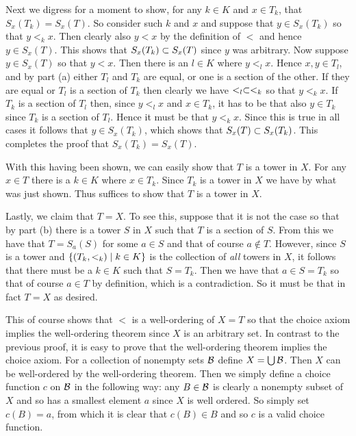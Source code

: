{{    Next we digress for a moment to show, for any $k \in K$ and $x \in T_k$, that $S_x(T_k) = S_x(T)$.
    So consider such $k$ and $x$ and suppose that $y \in S_x(T_k)$ so that $y <_k x$.
    Then clearly also $y < x$ by the definition of $<$ and hence $y \in S_x(T)$.
    This shows that $S_x(T_k) \ss S_x(T)$ since $y$ was arbitrary.
    Now suppose $y \in S_x(T)$ so that $y < x$.
    Then there is an $l \in K$ where $y <_l x$.
    Hence $x,y \in T_l$, and by part (a) either $T_l$ and $T_k$ are equal, or one is a section of the other.
    If they are equal or $T_l$ is a section of $T_k$ then clearly we have $<_l \ss <_k$ so that $y <_k x$.
    If $T_k$ is a section of $T_l$ then, since $y <_l x$ and $x \in T_k$, it has to be that also $y \in T_k$ since $T_k$ is a section of $T_l$.
    Hence it must be that $y <_k x$.
    Since this is true in all cases it follows that $y \in S_x(T_k)$, which shows that $S_x(T) \ss S_x(T_k)$.
    This completes the proof that $S_x(T_k) = S_x(T)$.

    With this having been shown, we can easily show that $T$ is a tower in $X$.
    For any $x \in T$ there is a $k \in K$ where $x \in T_k$.
    Since $T_k$ is a tower in $X$ we have
    by what was just shown.
    Thus suffices to show that $T$ is a tower in $X$.

    Lastly, we claim that $T = X$.
    To see this, suppose that it is not the case so that by part (b) there is a tower $S$ in $X$ such that $T$ is a section of $S$.
    From this we have that $T = S_a(S)$ for some $a \in S$ and that of course $a \notin T$.
    However, since $S$ is a tower and $\braces{(T_k,<_k) \where k \in K}$ is the collection of \emph{all} towers in $X$, it follows that there must be a $k \in K$ such that $S = T_k$.
    Then we have that $a \in S = T_k$ so that of course $a \in T$ by definition, which is a contradiction.
    So it must be that in fact $T = X$ as desired.

    This of course shows that $<$ is a well-ordering of $X = T$ so that the choice axiom implies the well-ordering theorem since $X$ is an arbitrary set.
    In contrast to the previous proof, it is easy to prove that the well-ordering theorem implies the choice axiom.
    For a collection of nonempty sets $\cB$ define $X = \bigcup \cB$.
    Then $X$ can be well-ordered by the well-ordering theorem.
    Then we simply define a choice function $c$ on $\cB$ in the following way: any $B \in \cB$ is clearly a nonempty subset of $X$ and so has a smallest element $a$ since $X$ is well ordered.
    So simply set $c(B) = a$, from which it is clear that $c(B) \in B$ and so $c$ is a valid choice function.
  }
}

\renewcommand\thesubsection{\arabic{subsection}}
